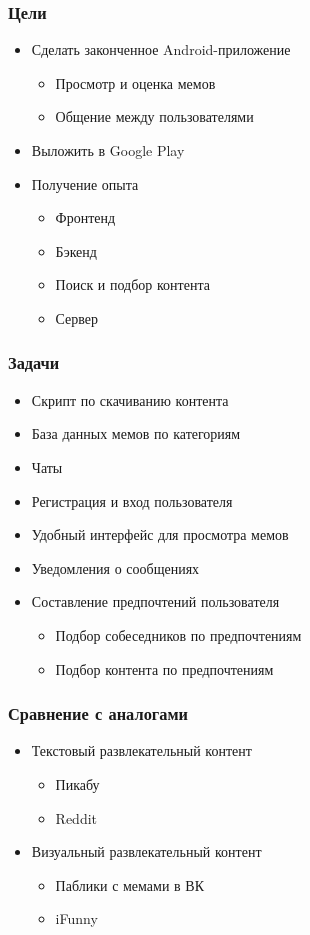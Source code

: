 \documentclass[xetex,mathserif,serif]{beamer}
\begin{document}
	\begin{frame}
		\frametitle{Цели}
			\begin{itemize}
		 		\item Сделать законченное Android-приложение
		 		    \begin{itemize}
    			    	\item Просмотр и оценка мемов
    			    	\item Общение между пользователями
    		    	\end{itemize}
		 		\item Выложить в Google Play
				\item Получение опыта
    				\begin{itemize}
    			    	\item Фронтенд
    			    	\item Бэкенд
    			    	\item Поиск и подбор контента
    			    	\item Сервер
    		    	\end{itemize}
			\end{itemize}
	\end{frame}
	
	\begin{frame}
		\frametitle{Задачи}
			\begin{itemize}
			    \item Скрипт по скачиванию контента
		 		\item База данных мемов по категориям
				\item Чаты
				\item Регистрация и вход пользователя
				\item Удобный интерфейс для просмотра мемов
				\item Уведомления о сообщениях
				\item Составление предпочтений пользователя
					\begin{itemize}
				    	\item Подбор собеседников по предпочтениям
				    	\item Подбор контента по предпочтениям
			    	\end{itemize}
			\end{itemize}
	\end{frame}	
	
	\begin{frame}
		\frametitle{Сравнение с аналогами}
			\begin{itemize}
				\item Текстовый развлекательный контент
					\begin{itemize}
				    	\item Пикабу
				    	\item Reddit
			    	\end{itemize}
			    \item Визуальный развлекательный контент
					\begin{itemize}
				    	\item Паблики с мемами в ВК
				    	\item iFunny
			    	\end{itemize}
			\end{itemize}
	\end{frame}		
	
\end{document}
